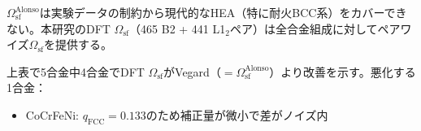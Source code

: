 \documentclass[5p,10pt]{elsarticle}
\begin{document}
$\Omega_\text{sf}^\text{Alonso}$は実験データの制約から現代的なHEA（特に耐火BCC系）をカバーできない。本研究のDFT $\Omega_\text{sf}$（465 B2 + 441 L1$_2$ペア）は全合金組成に対してペアワイズ$\Omega_\text{sf}$を提供する。

上表で5合金中4合金でDFT $\Omega_\text{sf}$がVegard（$= \Omega_\text{sf}^\text{Alonso}$）より改善を示す。悪化する1合金：
\begin{itemize}
  \item CoCrFeNi: $q_\text{FCC} = 0.133$のため補正量が微小で差がノイズ内
\end{itemize}







\end{document}
